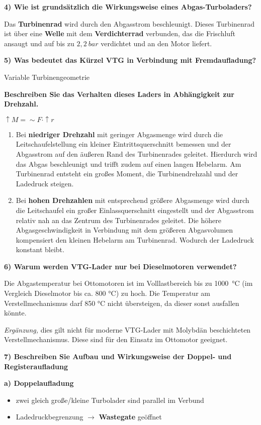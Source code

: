 \textbf{4) Wie ist grundsätzlich die Wirkungsweise eines
Abgas-Turboladers?}

Das \textbf{Turbinenrad} wird durch den Abgasstrom beschleunigt. Dieses
Turbinenrad ist über eine \textbf{Welle} mit dem \textbf{Verdichterrad}
verbunden, das die Frischluft ansaugt und auf bis zu $2,2~bar$
verdichtet und an den Motor liefert.

\textbf{5) Was bedeutet das Kürzel VTG in Verbindung mit
Fremdaufladung?}

Variable Turbinengeometrie

\textbf{Beschreiben Sie das Verhalten dieses Laders in Abhängigkeit zur
Drehzahl.}

$\boxed{\uparrow M = \sim F \cdot \uparrow r}$

\begin{enumerate}
\item
  Bei \textbf{niedriger Drehzahl} mit geringer Abgasmenge wird durch die
  Leitschaufelstellung ein kleiner Eintrittsquerschnitt bemessen und der
  Abgasstrom auf den äußeren Rand des Turbinenrades geleitet. Hierdurch
  wird das Abgas beschleunigt und trifft zudem auf einen langen
  Hebelarm. Am Turbinenrad entsteht ein großes Moment, die
  Turbinendrehzahl und der Ladedruck steigen.
\item
  Bei \textbf{hohen Drehzahlen} mit entsprechend größere Abgasmenge wird
  durch die Leitschaufel ein großer Einlassquerschnitt eingestellt und
  der Abgasstrom relativ nah an das Zentrum des Turbinenrades geleitet.
  Die höhere Abgasgeschwindigkeit in Verbindung mit dem größeren
  Abgasvolumen kompensiert den kleinen Hebelarm am Turbinenrad. Wodurch
  der Ladedruck konstant bleibt.
\end{enumerate}

\textbf{6) Warum werden VTG-Lader nur bei Dieselmotoren verwendet?}

Die Abgastemperatur bei Ottomotoren ist im Volllastbereich bis zu
1000~°C (im Vergleich Dieselmotor bis ca. 800 °C) zu hoch. Die
Temperatur am Verstellmechanismus darf 850 °C nicht übersteigen, da
dieser sonst ausfallen könnte.

\emph{Ergänzung,} dies gilt nicht für moderne VTG-Lader mit Molybdän
beschichteten Verstellmechanismus. Diese sind für den Einsatz im
Ottomotor geeignet.

\textbf{7) Beschreiben Sie Aufbau und Wirkungsweise der Doppel- und
Registeraufladung}

\textbf{a) Doppelaufladung}

\begin{itemize}
\item
  zwei gleich große/kleine Turbolader sind parallel im Verbund
\item
  Ladedruckbegrenzung $\to$ \textbf{Wastegate} geöffnet
\end{itemize}

